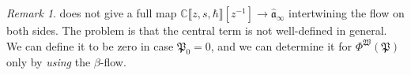 \documentclass[10pt,a4paper,oneside,no-math,reqno]{amsart}%
\theoremstyle{plain}
\newtheorem{corollary}[theorem]{Corollary}
\theoremstyle{definition}
\theoremstyle{remark}
\newtheorem{remark}[theorem]{Remark}
\numberwithin{equation}{section}
\newcommand{\mb}[1]{\mathbb{#1}}
\newcommand{\mf}[1]{\mathfrak{#1}}
\newcommand{\mc}[1]{\mathcal{#1}}
\newcommand{\1}{\mathds{1}}
\newcommand{\C}{\mb{C}}
\newcommand{\Z}{\mb{Z}}
\newcommand{\<}{\langle}
\renewcommand{\>}{\rangle}
\newcommand{\del}{\partial}
\DeclareMathOperator{\ad}{ad}
\begin{document}
\begin{remark}
     does not give a full map $ \C \llbracket z, s, \hbar \rrbracket [z^{-1} ] \to \widehat{\mf{a}}_\infty$ intertwining the flow on both sides. The problem is that the central term is not well-defined in general. We can define it to be zero in case $ \mf{P}_0 = 0$, and we can determine it for $ \Phi^{\mf{W}} (\mf{P}) $ only by \emph{using} the $ \beta$-flow.
\end{remark}



\end{document}
